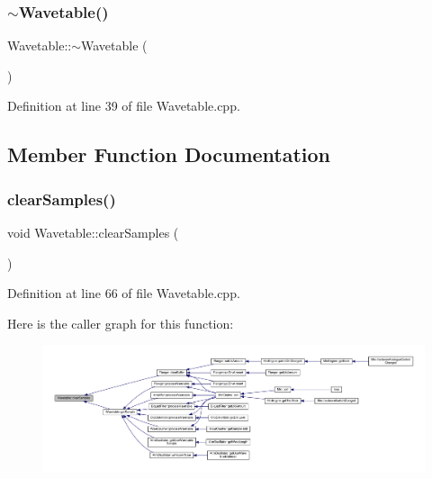 \mbox{\label{class_wavetable_abcb5f277ac5644c679f9b77b0786d813}} 
\subsubsection{\texorpdfstring{$\sim$\+Wavetable()}{~Wavetable()}}
{\footnotesize\ttfamily Wavetable\+::$\sim$\+Wavetable (\begin{DoxyParamCaption}{ }\end{DoxyParamCaption})}



Definition at line 39 of file Wavetable.\+cpp.



\subsection{Member Function Documentation}
\mbox{\label{class_wavetable_ae4815729b57d8625a17ae0421b394217}} 
\subsubsection{\texorpdfstring{clear\+Samples()}{clearSamples()}}
{\footnotesize\ttfamily void Wavetable\+::clear\+Samples (\begin{DoxyParamCaption}{ }\end{DoxyParamCaption})}



Definition at line 66 of file Wavetable.\+cpp.

Here is the caller graph for this function\+:
\nopagebreak
\begin{figure}[H]
\begin{center}
\leavevmode
\includegraphics[width=350pt]{d8/d3f/class_wavetable_ae4815729b57d8625a17ae0421b394217_icgraph}
\end{center}
\end{figure}
\mbox{\label{class_wavetable_a2ed27fd46eac11bd828c7111fca7bc0b}} 
